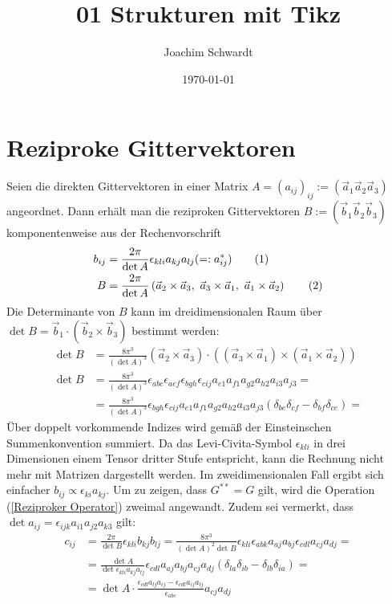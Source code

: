 \documentclass[a4paper,12pt]{article}
\newcommand\numberthis{\addtocounter{equation}{1}\tag{\theequation}}
\newcommand{\kla}{}
\begin{document}
\title{01 Strukturen mit Tikz}
\author{Joachim Schwardt}
\date{\today}
\maketitle

\section{Reziproke Gittervektoren}
Seien die direkten Gittervektoren in einer Matrix $A=(a_{ij})_{ij}:=(\vec{a}_1\vec{a}_2\vec{a}_3)$ angeordnet. Dann erhält man die reziproken Gittervektoren $B:=(\vec{b}_1\vec{b}_2\vec{b}_3)$ komponentenweise aus der Rechenvorschrift
\begin{align*}
b_{ij}&=\frac{2\pi}{\det A}\epsilon_{kli}a_{kj}a_{lj}(=:a_{ij}^\ast)\numberthis\label{Reziproker Operator}\\
B&=\frac{2\pi}{\det A}\kla\left( {\vec{a}_2\times\vec{a}_3,\ \vec{a}_3\times\vec{a}_1,\ \vec{a}_1\times\vec{a}_2} \right)\numberthis\label{Reziproker Operator Matrix}
\end{align*}
Die Determinante von $B$ kann im dreidimensionalen Raum über $\det B=\vec{b}_1\cdot(\vec{b}_2\times\vec{b}_3)$ bestimmt werden:
\begin{align*}
\det B&=\frac{8\pi^3}{(\det A)^3}(\vec{a}_2\times\vec{a}_3)\cdot\kla\left( {(\vec{a}_3\times\vec{a}_1)\times(\vec{a}_1\times\vec{a}_2)} \right)\\
\det B&=\frac{8\pi^3}{(\det A)^3}\epsilon_{abc}\epsilon_{aef}\epsilon_{bgh}\epsilon_{cij}a_{e1}a_{f1}a_{g2}a_{h2}a_{i3}a_{j3}=\\
&=\frac{8\pi^3}{(\det A)^3}\epsilon_{bgh}\epsilon_{cij}a_{e1}a_{f1}a_{g2}a_{h2}a_{i3}a_{j3}(\delta_{be}\delta_{cf}-\delta_{bf}\delta_{ce})=
\end{align*}
Über doppelt vorkommende Indizes wird gemäß der Einsteinschen Summenkonvention summiert. Da das Levi-Civita-Symbol $\epsilon_{kli}$ in drei Dimensionen einem Tensor dritter Stufe entspricht, kann die Rechnung nicht mehr mit Matrizen dargestellt werden. Im zweidimensionalen Fall ergibt sich einfacher $b_{ij}\propto\epsilon_{ki}a_{kj}$. Um zu zeigen, dass $G^{\ast\ast}=G$ gilt, wird die Operation (\ref{Reziproker Operator}) zweimal angewandt. Zudem sei vermerkt, dass $\det a_{ij}=\epsilon_{ijk}a_{i1}a_{j2}a_{k3}$ gilt:
\begin{align*}
c_{ij}&=\frac{2\pi}{\det B}\epsilon_{kli}b_{kj}b_{lj}=\frac{8\pi^3}{(\det A)^2\det B}\epsilon_{kli}\epsilon_{abk}a_{aj}a_{bj}\epsilon_{cdl}a_{cj}a_{dj}=\\
&=\frac{\det A}{\det\epsilon_{kli}a_{kj}a_{lj}}\epsilon_{cdl}a_{aj}a_{bj}a_{cj}a_{dj}(\delta_{la}\delta_{ib}-\delta_{lb}\delta_{ia})=\\
&=\det A\cdot\frac{\epsilon_{cdl}a_{lj}a_{ij}-\epsilon
_{cdl}a_{ij}a_{lj}}{\epsilon_{abc}}a_{cj}a_{dj}
\end{align*} 
\end{document}
